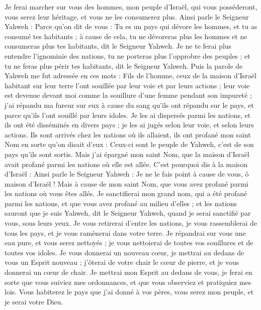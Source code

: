 \begin{multicols}{2}
Je ferai marcher sur vous des hommes, mon peuple d'Israël, qui vous posséderont, vous serez leur héritage, et vous ne les consumerez plus.
Ainsi parle le Seigneur Yahweh : Parce qu'on dit de vous : Tu es un pays qui dévore les hommes, et tu as consumé tes habitants ;
à cause de cela, tu ne dévoreras plus les hommes et ne consumeras plus tes habitants, dit le Seigneur Yahweh.
Je ne te ferai plus entendre l'ignominie des nations, tu ne porteras plus l'opprobre des peuples ; et tu ne feras plus périr tes habitants, dit le Seigneur Yahweh.
Puis la parole de Yahweh me fut adressée en ces mots :
Fils de l’homme, ceux de la maison d'Israël habitant sur leur terre l'ont souillée par leur voie et par leurs actions ; leur voie est devenue devant moi comme la souillure d’une femme pendant son impureté\FTNT{} ;
j'ai répandu ma fureur sur eux à cause du sang qu'ils ont répandu sur le pays, et parce qu'ils l'ont souillé par leurs idoles.
Je les ai dispersés parmi les nations, et ils ont été disséminés en divers pays ; je les ai jugés selon leur voie, et selon leurs actions.
Ils sont arrivés chez les nations où ils allaient, ils ont profané mon saint Nom en sorte qu’on disait d’eux : Ceux-ci sont le peuple de Yahweh, c’est de son pays qu’ils sont sortis\FTNT{}.
Mais j'ai épargné mon saint Nom, que la maison d'Israël avait profané parmi les nations où elle est allée.
C'est pourquoi dis à la maison d'Israël : Ainsi parle le Seigneur Yahweh : Je ne le fais point à cause de vous, ô maison d'Israël ! Mais à cause de mon saint Nom, que vous avez profané parmi les nations où vous êtes allés\FTNT{}.
Je sanctifierai mon grand nom, qui a été profané parmi les nations, et que vous avez profané au milieu d’elles ; et les nations sauront que je suis Yahweh, dit le Seigneur Yahweh, quand je serai sanctifié par vous, sous leurs yeux.
Je vous retirerai d'entre les nations, je vous rassemblerai de tous les pays, et je vous ramènerai dans votre terre.
Je répandrai sur vous une eau pure\FTNT{}, et vous serez nettoyés ; je vous nettoierai de toutes vos souillures et de toutes vos idoles.
Je vous donnerai un nouveau cœur, je mettrai au dedans de vous un Esprit nouveau ; j'ôterai de votre chair le cœur de pierre, et je vous donnerai un cœur de chair\FTNT{}.
Je mettrai mon Esprit au dedans de vous, je ferai en sorte que vous suiviez mes ordonnances, et que vous observiez et pratiquiez mes lois.
Vous habiterez le pays que j'ai donné à vos pères, vous serez mon peuple, et je serai votre Dieu.

\end{multicols}
